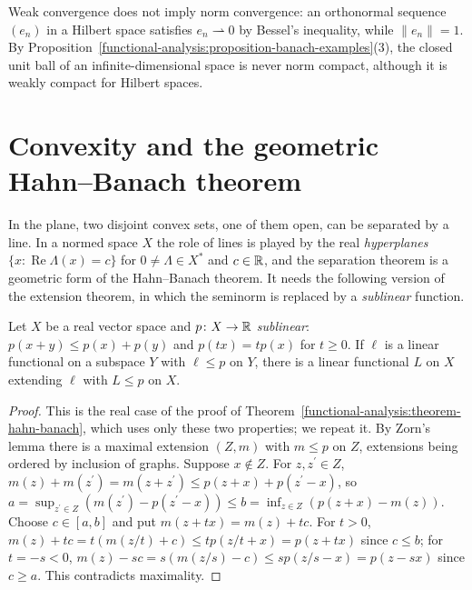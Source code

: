 \begin{counterexample}\label{functional-analysis:counterexample-weak}
Weak convergence does not imply norm convergence: an orthonormal sequence $(e_n)$ in a Hilbert space satisfies $e_n \rightharpoonup 0$ by Bessel's inequality, while $\|e_n\| = 1$. By
Proposition~\ref{functional-analysis:proposition-banach-examples}(3), the closed unit ball of an infinite-dimensional space is never norm compact, although it is weakly compact for Hilbert spaces.
\end{counterexample}

\section{Convexity and the geometric Hahn--Banach theorem}\label{functional-analysis:section-separation}

In the plane, two disjoint convex sets, one of them open, can be separated by a line. In a normed space $X$ the role of lines is played by the real \emph{hyperplanes}
$\{x : \operatorname{Re}\Lambda(x) = c\}$ for $0 \neq \Lambda \in X^*$ and $c \in \mathbb{R}$, and the separation theorem is a geometric form of the Hahn--Banach theorem. It needs the following version of the extension
theorem, in which the seminorm is replaced by a \emph{sublinear} function.

\begin{lemma}\label{functional-analysis:lemma-sublinear-extension}
Let $X$ be a real vector space and $p \colon X \to \mathbb{R}$ \emph{sublinear}: $p(x + y) \leq p(x) + p(y)$ and $p(tx) = tp(x)$ for $t \geq 0$. If $\ell$ is a linear functional on a subspace $Y$ with $\ell \leq p$ on $Y$,
there is a linear functional $L$ on $X$ extending $\ell$ with $L \leq p$ on $X$.
\end{lemma}

\begin{proof}
This is the real case of the proof of Theorem~\ref{functional-analysis:theorem-hahn-banach}, which uses only these two properties; we repeat it. By Zorn's lemma there is a maximal extension $(Z, m)$ with
$m \leq p$ on $Z$, extensions being ordered by inclusion of graphs. Suppose $x \notin Z$. For $z, z^{\prime} \in Z$, $m(z) + m(z^{\prime}) = m(z + z^{\prime}) \leq p(z + x) + p(z^{\prime} - x)$, so
$a = \sup_{z^{\prime} \in Z}(m(z^{\prime}) - p(z^{\prime} - x)) \leq b = \inf_{z \in Z}(p(z + x) - m(z))$. Choose $c \in [a, b]$ and put $m(z + tx) = m(z) + tc$. For $t > 0$,
$m(z) + tc = t(m(z/t) + c) \leq tp(z/t + x) = p(z + tx)$ since $c \leq b$; for $t = -s < 0$, $m(z) - sc = s(m(z/s) - c) \leq sp(z/s - x) = p(z - sx)$ since $c \geq a$. This contradicts maximality.
\end{proof}

